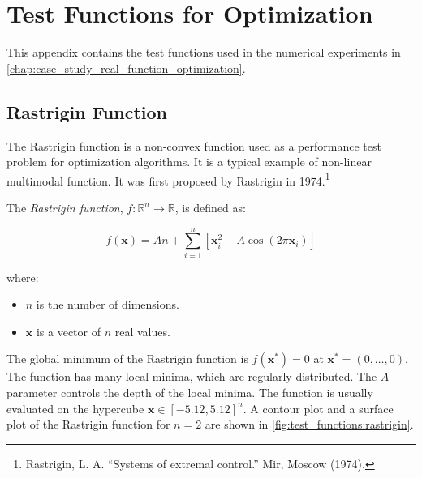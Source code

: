 \chapter{Test Functions for Optimization}
\label{chap:test_functions}
  This appendix contains the test functions used in the numerical experiments in 
  \vref{chap:case_study_real_function_optimization}.

  \section{Rastrigin Function}
  \label{sec:test_functions:rastrigin}
    The Rastrigin function is a non-convex function used as a performance test problem for 
    optimization algorithms.
    It is a typical example of non-linear multimodal function.
    It was first proposed by Rastrigin in 1974.\footnote{
      Rastrigin, L. A. \enquote{Systems of extremal control.} Mir, Moscow (1974).
    }

    \begin{Definition}
      \label{def:test_functions:rastrigin}
      The \emph{Rastrigin function}, \(f: \mathbb{R}^n \rightarrow \mathbb{R}\), is defined as:

      \begin{equation}
        \label{eq:test_functions:rastrigin}
        f(\mathbf{x}) = An + \sum_{i=1}^{n} \left[ \mathbf{x}_i^2 - A\cos(2\pi \mathbf{x}_i) \right]
      \end{equation}
        
      where:

      \begin{itemize}
        \item \(n\) is the number of dimensions.
        \item \(\mathbf{x}\) is a vector of \(n\) real values.
      \end{itemize}
    \end{Definition}

    The global minimum of the Rastrigin function is \(f(\mathbf{x}^*) = 0\) at \(\mathbf{x}^* = 
    (0, \ldots, 0)\).
    The function has many local minima, which are regularly distributed.
    The \(A\) parameter controls the depth of the local minima.
    The function is usually evaluated on the hypercube \(\mathbf{x} \in [-5.12, 5.12]^n\).
    A contour plot and a surface plot of the Rastrigin function for \(n = 2\) are shown in
    \vref{fig:test_functions:rastrigin}.

